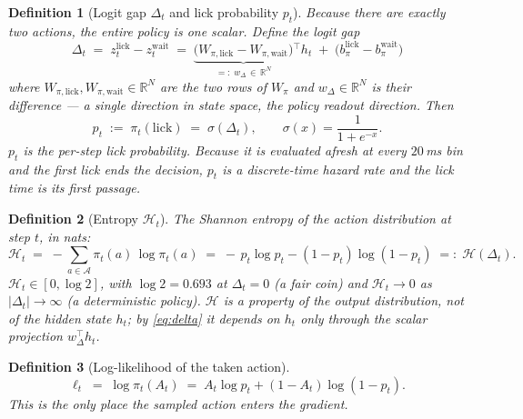 \documentclass[11pt]{article}
\newtheorem{definition}{Definition}
\newcommand{\R}{\mathbb{R}}
\newcommand{\1}{\mathbf{1}}
\begin{document}
\begin{definition}[Logit gap $\Delta_t$ and lick probability $p_t$]
Because there are exactly two actions, the entire policy is one scalar. Define the
\emph{logit gap}
\begin{equation}
  \boxed{\;\Delta_t \;=\; z_t^{\mathrm{lick}} - z_t^{\mathrm{wait}}
    \;=\; \underbrace{\bigl(W_{\pi,\mathrm{lick}} - W_{\pi,\mathrm{wait}}\bigr)}_{=:\;w_\Delta \,\in\, \R^{N}}
      {}^{\!\top} h_t \;+\; \bigl(b_{\pi}^{\mathrm{lick}} - b_{\pi}^{\mathrm{wait}}\bigr)\;}
  \label{eq:delta}
\end{equation}
where $W_{\pi,\mathrm{lick}}, W_{\pi,\mathrm{wait}} \in \R^{N}$ are the two rows of $W_\pi$
and $w_\Delta \in \R^{N}$ is their difference --- a single direction in state space, the
\emph{policy readout direction}. Then
\begin{equation}
  p_t \;:=\; \pi_t(\mathrm{lick}) \;=\; \sigma(\Delta_t), \qquad
  \sigma(x) = \frac{1}{1+e^{-x}}.
\end{equation}
$p_t$ is the per-step lick probability. Because it is evaluated afresh at every $20$\,ms bin
and the first lick ends the decision, $p_t$ is a discrete-time \emph{hazard rate} and the
lick time is its first passage.
\end{definition}

\begin{definition}[Entropy $\mathcal{H}_t$]
The Shannon entropy of the action distribution at step $t$, in nats:
\begin{equation}
  \mathcal{H}_t \;=\; -\!\!\sum_{a \in \mathcal{A}}\! \pi_t(a)\,\log \pi_t(a)
   \;=\; -\,p_t \log p_t - (1-p_t)\log(1-p_t) \;=:\; \mathcal{H}(\Delta_t).
  \label{eq:entropy}
\end{equation}
$\mathcal{H}_t \in [0, \log 2]$, with $\log 2 = 0.693$ at $\Delta_t = 0$ (a fair coin) and
$\mathcal{H}_t \to 0$ as $|\Delta_t| \to \infty$ (a deterministic policy). \emph{$\mathcal{H}$
is a property of the output distribution, not of the hidden state $h_t$}; by \eqref{eq:delta}
it depends on $h_t$ only through the scalar projection $w_\Delta^\top h_t$.
\end{definition}

\begin{definition}[Log-likelihood of the taken action]
\begin{equation}
  \ell_t \;=\; \log \pi_t(A_t)
   \;=\; A_t \log p_t + (1-A_t)\log(1-p_t).
\end{equation}
This is the only place the sampled action enters the gradient.
\end{definition}
\end{document}
